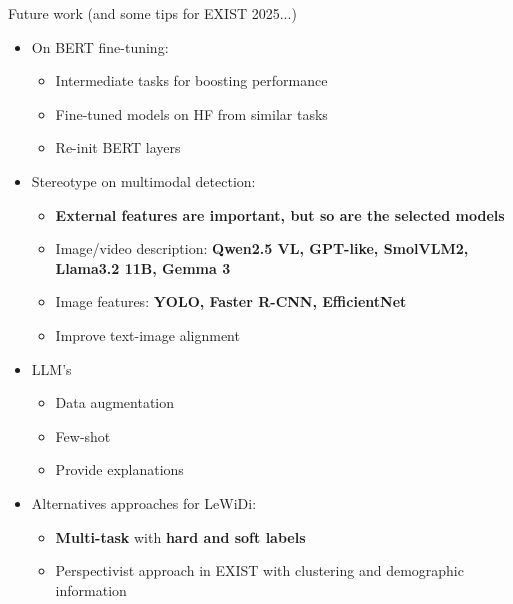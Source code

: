 \begin{frame}{Future work (and some tips for EXIST 2025...)}
    \begin{itemize}
        \item On BERT fine-tuning:
        \begin{itemize}
            \item Intermediate tasks for boosting performance
            \item Fine-tuned models on HF from similar tasks
            \item Re-init BERT layers
        \end{itemize}
        \item Stereotype on multimodal detection: 
        \begin{itemize}
            \item \textbf{External features are important, but so are the selected models}
            \item Image/video description: \textbf{Qwen2.5 VL, GPT-like, SmolVLM2, Llama3.2 11B, Gemma 3}
            \item Image features: \textbf{YOLO, Faster R-CNN, EfficientNet}
            \item Improve text-image alignment
        \end{itemize} 
        \item LLM's
        \begin{itemize}
            \item Data augmentation
            \item Few-shot
            \item Provide explanations
        \end{itemize}
        \item Alternatives approaches for LeWiDi:
        \begin{itemize}
            \item \textbf{Multi-task} with \textbf{hard and soft labels} 
            \item Perspectivist approach in EXIST with clustering and demographic information
        \end{itemize}
    \end{itemize}
    
\end{frame}

